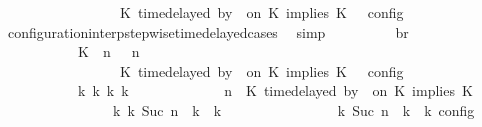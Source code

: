 \begin{isabellebody}
\ \ \ \ \ \ \ \ \ \ \ \ \ \ {\isasymturnstile}\ {\isasymPsi}\ {\isasymtriangleright}\ {\isacharparenleft}{\isacharparenleft}K\ time{\isacharminus}delayed\ by\ {\isasymdelta}{\isasymtau}\ on\ K\ implies\ K\ {\isacharhash}\ {\isasymPhi}{\isacharparenright}\ {\isasymrbrakk}\isactrlsub c\isactrlsub o\isactrlsub n\isactrlsub f\isactrlsub i\isactrlsub g{\isacartoucheclose}\isanewline
\ \ \ \ \ \ \ \ \isamarkupfalse%
\ configuration{\isacharunderscore}interp{\isacharunderscore}stepwise{\isacharunderscore}timedelayed{\isacharunderscore}cases\ \isamarkupfalse%
\ simp\isanewline
\ \ \ \ \ \ \isamarkupfalse%
\ \isamarkupfalse%
\ br{}{\isacharcolon}\isanewline
\ \ \ \ \ \ \ \ {\isacartoucheopen}{\isasymrho}\ {\isasymin}\ {\isasymlbrakk}\ {\isacharparenleft}{\isacharparenleft}K\ {\isasymnot}{\isasymUp}\ n{\isacharparenright}\ {\isacharhash}\ {\isasymGamma}{\isacharparenright}{\isacharcomma}\ n\isanewline
\ \ \ \ \ \ \ \ \ \ \ \ \ \ {\isasymturnstile}\ {\isasymPsi}\ {\isasymtriangleright}\ {\isacharparenleft}{\isacharparenleft}K\ time{\isacharminus}delayed\ by\ {\isasymdelta}{\isasymtau}\ on\ K\ implies\ K\ {\isacharhash}\ {\isasymPhi}{\isacharparenright}\ {\isasymrbrakk}\isactrlsub c\isactrlsub o\isactrlsub n\isactrlsub f\isactrlsub i\isactrlsub g\isanewline
\ \ \ \ \ \ \ \ \ \ {\isasymLongrightarrow}\ {\isasymexists}{\isasymGamma}\isactrlsub k\ {\isasymPsi}\isactrlsub k\ {\isasymPhi}\isactrlsub k\ k{\isachardot}\isanewline
\ \ \ \ \ \ \ \ \ \ \ \ {\isacharparenleft}{\isacharparenleft}{\isasymGamma}{\isacharcomma}\ n\ {\isasymturnstile}\ {\isacharparenleft}{\isacharparenleft}K\ time{\isacharminus}delayed\ by\ {\isasymdelta}{\isasymtau}\ on\ K\ implies\ K\ {\isacharhash}\ {\isasymPsi}{\isacharparenright}\ {\isasymtriangleright}\ {\isasymPhi}{\isacharparenright}\isanewline
\ \ \ \ \ \ \ \ \ \ \ \ \ \ \ \ {\isasymhookrightarrow}\isactrlbsup k\isactrlesup \ {\isacharparenleft}{\isasymGamma}\isactrlsub k{\isacharcomma}\ Suc\ n\ {\isasymturnstile}\ {\isasymPsi}\isactrlsub k\ {\isasymtriangleright}\ {\isasymPhi}\isactrlsub k{\isacharparenright}{\isacharparenright}\isanewline
\ \ \ \ \ \ \ \ \ \ \ \ {\isasymand}\ {\isasymrho}\ {\isasymin}\ {\isasymlbrakk}\ {\isasymGamma}\isactrlsub k{\isacharcomma}\ Suc\ n\ {\isasymturnstile}\ {\isasymPsi}\isactrlsub k\ {\isasymtriangleright}\ {\isasymPhi}\isactrlsub k\ {\isasymrbrakk}\isactrlsub c\isactrlsub o\isactrlsub n\isactrlsub f\isactrlsub i\isactrlsub g{\isacartoucheclose}\isanewline

\end{isabellebody}
